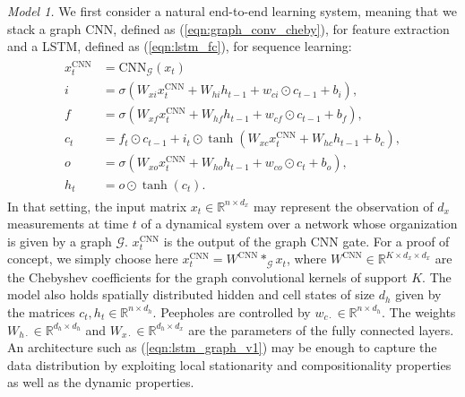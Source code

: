 \documentclass{article} %
\newcommand{\R}{\mathbb{R}}
\newcommand{\G}{\mathcal{G}}
\newcommand{\eqnref}[1]{(\ref{eqn:#1})}
\begin{document}
{\it Model 1.} We first consider a natural end-to-end learning system, meaning that we stack a graph CNN, defined as
\eqnref{graph_conv_cheby}, for feature extraction and a LSTM, defined as \eqnref{lstm_fc}, for sequence learning: \begin{align} \label{eqn:lstm_graph_v1}
\begin{split}
	x_t^{\textrm{CNN}} &=  \textrm{CNN}_\G(x_t)\\
	i &= \sigma(W_{xi} x_t^{\textrm{CNN}} + W_{hi} h_{t-1}  +
	            w_{ci} \odot c_{t-1} + b_i), \\
	f &= \sigma(W_{xf} x_t^{\textrm{CNN}} + W_{hf} h_{t-1} + w_{cf} \odot c_{t-1} + b_f), \\
	c_t &= f_t \odot c_{t-1} + i_t \odot \tanh(W_{xc} x_t^{\textrm{CNN}} + W_{hc} h_{t-1} + b_c), \\
	o &= \sigma(W_{xo} x_t^{\textrm{CNN}} + W_{ho} h_{t-1} + w_{co} \odot c_t + b_o), \\
	h_t &= o \odot \tanh(c_t).
\end{split}
\end{align}
In that setting, the input matrix $x_t \in \R^{n \times d_x}$ may represent the
observation of $d_x$ measurements at time $t$ of a dynamical system over a
network whose organization is given by a graph $\G$. $x_t^{\textrm{CNN}}$ is the output of the graph CNN gate. For a proof of concept, we simply choose here $x_t^{\textrm{CNN}} = W^{\textrm{CNN}} \ast_\G x_t$, where $W^{\textrm{CNN}} \in \R^{K \times d_x \times d_x}$ are the Chebyshev coefficients  for the graph convolutional kernels of support $K$. The model also holds spatially distributed hidden and cell states of size $d_h$ given by the matrices $c_t, h_t \in \R^{n \times d_h}$. Peepholes are controlled by $w_{c\cdot} \in \R^{n \times d_h}$. The weights $W_{h\cdot} \in
\R^{ d_h \times d_h}$ and $W_{x\cdot} \in \R^{d_h \times d_x}$ are the parameters of the fully connected layers. An architecture such as \eqnref{lstm_graph_v1} may be enough to capture the data distribution by exploiting local stationarity and compositionality properties as well as the dynamic properties.
\end{document}
